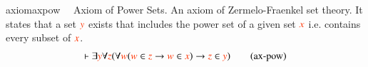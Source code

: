 \begin{restatable}{axiom}{axpow}~~ Axiom of Power Sets.  An axiom of
Zermelo-Fraenkel set theory.  It
       states that a set $\msc{y}$ exists that includes the power set of a
given
       set $\msc{x}$ i.e. contains every subset of $\msc{x}$.  ~
\begin{align}
\vdash \exists \msc{y} \forall \msc{z} ( \forall \msc{w} ( \msc{w} \in \msc{z}
    \rightarrow \msc{w} \in \msc{x} ) \rightarrow \msc{z} \in \msc{y}
    )\label{eq:ax-pow}\tag{ax-pow}
\end{align}
\end{restatable}

\cotr

\cnvsym

\intasym

\intirr

